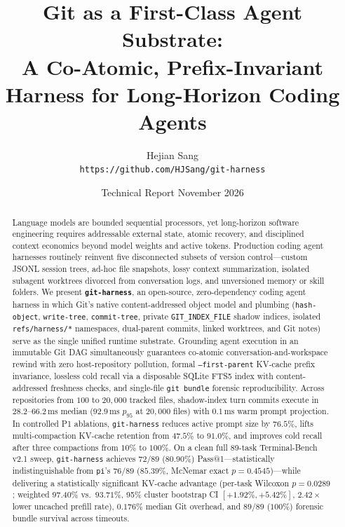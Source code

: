 \documentclass[11pt]{article}
\title{\textbf{Git as a First-Class Agent Substrate:\\A Co-Atomic, Prefix-Invariant Harness for Long-Horizon Coding Agents}}
\author{
  Hejian Sang\\[0.3em]
  {\small \texttt{https://github.com/HJSang/git-harness}}
}
\date{Technical Report \quad\textbullet\quad November 2026}
\begin{document}
\maketitle

\begin{abstract}
Language models are bounded sequential processors, yet long-horizon software engineering requires addressable external state, atomic recovery, and disciplined context economics beyond model weights and active tokens.
Production coding agent harnesses routinely reinvent five disconnected subsets of version control---custom JSONL session trees, ad-hoc file snapshots, lossy context summarization, isolated subagent worktrees divorced from conversation logs, and unversioned memory or skill folders.
We present \textbf{\texttt{git-harness}}, an open-source, zero-dependency coding agent harness in which Git's native content-addressed object model and plumbing (\texttt{hash-object}, \texttt{write-tree}, \texttt{commit-tree}, private \texttt{GIT\_INDEX\_FILE} shadow indices, isolated \texttt{refs/harness/*} namespaces, dual-parent commits, linked worktrees, and Git notes) serve as the single unified runtime substrate.
Grounding agent execution in an immutable Git DAG simultaneously guarantees co-atomic conversation-and-workspace rewind with zero host-repository pollution, formal \texttt{--first-parent} KV-cache prefix invariance, lossless cold recall via a disposable SQLite FTS5 index with content-addressed freshness checks, and single-file \texttt{git bundle} forensic reproducibility.
Across repositories from $100$ to $20{,}000$ tracked files, shadow-index turn commits execute in $28.2\text{--}66.2\,\mathrm{ms}$ median ($92.9\,\mathrm{ms}$ $p_{95}$ at $20{,}000$ files) with $0.1\,\mathrm{ms}$ warm prompt projection.
In controlled P1 ablations, \texttt{git-harness} reduces active prompt size by $76.5\%$, lifts multi-compaction KV-cache retention from $47.5\%$ to $91.0\%$, and improves cold recall after three compactions from $10\%$ to $100\%$.
On a clean full 89-task Terminal-Bench v2.1 sweep, \texttt{git-harness} achieves $72/89$ ($80.90\%$) Pass@1---statistically indistinguishable from \texttt{pi}'s $76/89$ ($85.39\%$, McNemar exact $p = 0.4545$)---while delivering a statistically significant KV-cache advantage (per-task Wilcoxon $p = 0.0289$; weighted $97.40\%$ vs.\ $93.71\%$, 95\% cluster bootstrap CI $[+1.92\%, +5.42\%]$, $2.42\times$ lower uncached prefill rate), $0.176\%$ median Git overhead, and $89/89$ ($100\%$) forensic bundle survival across timeouts.

\end{abstract}
\end{document}
